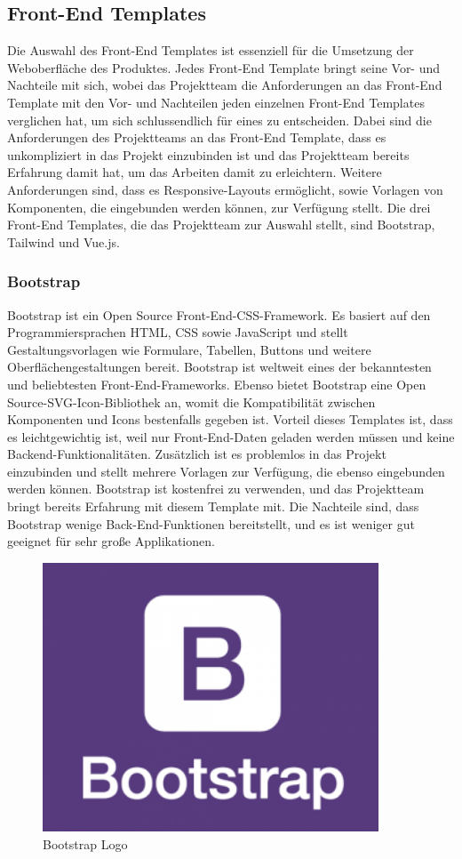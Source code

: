 \subsection{Front-End Templates}
Die Auswahl des Front-End Templates ist essenziell für die Umsetzung der Weboberfläche des Produktes. Jedes Front-End Template bringt seine Vor- und Nachteile mit sich, wobei das Projektteam die Anforderungen an das Front-End Template mit den Vor- und Nachteilen jeden einzelnen Front-End Templates verglichen hat, um sich schlussendlich für eines zu entscheiden. Dabei sind die Anforderungen des Projektteams an das Front-End Template, dass es unkompliziert in das Projekt einzubinden ist und das Projektteam bereits Erfahrung damit hat, um das Arbeiten damit zu erleichtern. Weitere Anforderungen sind, dass es Responsive-Layouts ermöglicht, sowie Vorlagen von Komponenten, die eingebunden werden können, zur Verfügung stellt. Die drei Front-End Templates, die das Projektteam zur Auswahl stellt, sind Bootstrap, Tailwind und Vue.js.

\subsubsection{Bootstrap}
Bootstrap ist ein Open Source Front-End-CSS-Framework. Es basiert auf den Programmiersprachen HTML, CSS sowie JavaScript und stellt Gestaltungsvorlagen wie Formulare, Tabellen, Buttons und weitere Oberflächengestaltungen bereit. Bootstrap ist weltweit eines der bekanntesten und beliebtesten Front-End-Frameworks. Ebenso bietet Bootstrap eine Open Source-SVG-Icon-Bibliothek an, womit die Kompatibilität zwischen Komponenten und Icons bestenfalls gegeben ist. Vorteil dieses Templates ist, dass es leichtgewichtig ist, weil nur Front-End-Daten geladen werden müssen und keine Backend-Funktionalitäten. Zusätzlich ist es problemlos in das Projekt einzubinden und stellt mehrere Vorlagen zur Verfügung, die ebenso eingebunden werden können. Bootstrap ist kostenfrei zu verwenden, und das Projektteam bringt bereits Erfahrung mit diesem Template mit. Die Nachteile sind, dass Bootstrap wenige Back-End-Funktionen bereitstellt, und es ist weniger gut geeignet für sehr große Applikationen.
\newline
\begin{figure}[h]
	\centering
	\includegraphics[height=8cm,width=10cm]{images/Bootstrap}
	\caption{Bootstrap Logo}
	\label{fig:Bootstrap Logo}
\end{figure}

